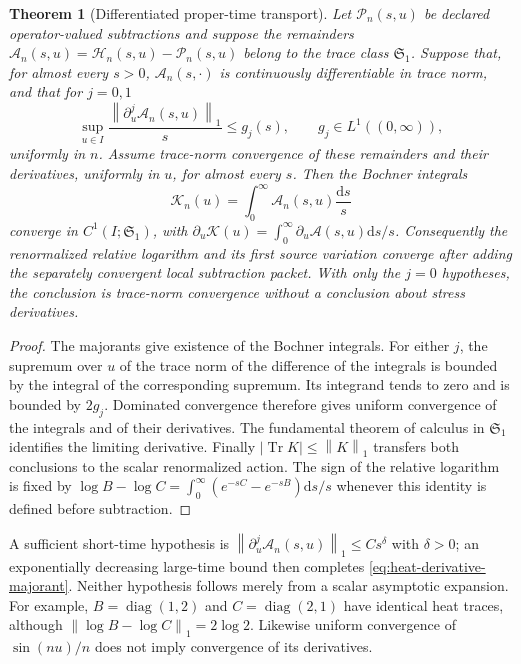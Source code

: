 \documentclass[11pt,a4paper,oneside]{book}
\theoremstyle{plain}
\newtheorem{theorem}{Theorem}[chapter]
\theoremstyle{definition}
\theoremstyle{remark}
\newcommand{\dd}{\mathrm d}
\newcommand{\Tr}{\operatorname{Tr}}
\newcommand{\diag}{\operatorname{diag}}
\newcommand{\norm}[1]{\left\lVert#1\right\rVert}
\newcommand{\src}[2]{\cite{#1}}
\begin{document}
\begin{theorem}[Differentiated proper-time transport]
\label{thm:proper-time-c1}
Let $\mathcal P_n(s,u)$ be declared operator-valued subtractions and
suppose the remainders
$\mathcal A_n(s,u)=\mathcal H_n(s,u)-\mathcal P_n(s,u)$ belong to the
trace class $\mathfrak S_1$.  Suppose that, for almost every $s>0$,
$\mathcal A_n(s,\cdot)$ is continuously differentiable in trace norm,
and that for $j=0,1$
\begin{equation}
 \sup_{u\in I}\frac{\norm{\partial_u^j\mathcal A_n(s,u)}_1}{s}
 \le g_j(s),\qquad g_j\in L^1((0,\infty)),
 \label{eq:heat-derivative-majorant}
\end{equation}
uniformly in $n$.  Assume trace-norm convergence of these remainders
and their derivatives, uniformly in $u$, for almost every $s$.
Then the Bochner integrals
\begin{equation}
 \mathcal K_n(u)=\int_0^\infty\mathcal A_n(s,u)\frac{\dd s}{s}
 \label{eq:proper-time-operator}
\end{equation}
converge in $C^1(I;\mathfrak S_1)$, with
$\partial_u\mathcal K(u)=\int_0^\infty\partial_u\mathcal A(s,u)\dd s/s$.
Consequently the renormalized relative logarithm and its first source
variation converge after adding the separately convergent local
subtraction packet.  With only the $j=0$ hypotheses, the conclusion is
trace-norm convergence without a conclusion about stress derivatives.
\end{theorem}
\begin{proof}
The majorants give existence of the Bochner integrals.  For either
$j$, the supremum over $u$ of the trace norm of the difference of the
integrals is bounded by the integral of the corresponding supremum.
Its integrand tends to zero and is bounded by $2g_j$.  Dominated
convergence therefore gives uniform convergence of the integrals and
of their derivatives.  The fundamental theorem of calculus in
$\mathfrak S_1$ identifies the limiting derivative.  Finally
$|\Tr K|\le\norm K_1$ transfers both conclusions to the scalar
renormalized action.  The sign of the relative logarithm is fixed by
$\log B-\log C=\int_0^\infty(e^{-sC}-e^{-sB})\dd s/s$ whenever this
identity is defined before subtraction.
\end{proof}
\src{R15}{thm:v15v37-operator-heat,thm:v15v38-c1-heat}

A sufficient short-time hypothesis is
$\norm{\partial_u^j\mathcal A_n(s,u)}_1\le Cs^\delta$ with
$\delta>0$; an exponentially decreasing large-time bound then completes
\eqref{eq:heat-derivative-majorant}.  Neither hypothesis follows merely
from a scalar asymptotic expansion.  For example,
$B=\diag(1,2)$ and $C=\diag(2,1)$ have identical heat traces, although
$\norm{\log B-\log C}_1=2\log2$.  Likewise uniform convergence of
$\sin(nu)/n$ does not imply convergence of its derivatives.
\src{R15}{thm:v15v37-subtraction-order,cth:v15v37-trace-cancellation}
\end{document}
